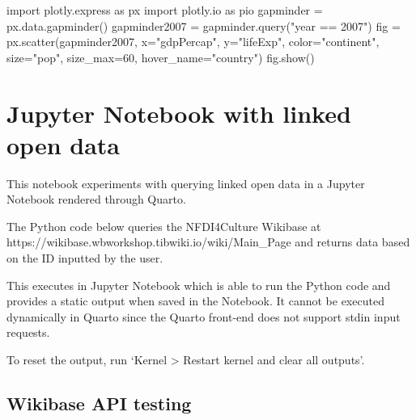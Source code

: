 \documentclass[
  letterpaper,
  DIV=11,
  numbers=noendperiod]{scrreprt}
\newenvironment{Shaded}{\begin{snugshade}}{\end{snugshade}}
\newcommand{\DecValTok}[1]{\textcolor[rgb]{0.68,0.00,0.00}{#1}}
\newcommand{\ImportTok}[1]{\textcolor[rgb]{0.00,0.46,0.62}{#1}}
\newcommand{\NormalTok}[1]{\textcolor[rgb]{0.00,0.23,0.31}{#1}}
\newcommand{\OperatorTok}[1]{\textcolor[rgb]{0.37,0.37,0.37}{#1}}
\newcommand{\StringTok}[1]{\textcolor[rgb]{0.13,0.47,0.30}{#1}}
\begin{document}
\begin{Shaded}
\begin{Highlighting}[]
\ImportTok{import}\NormalTok{ plotly.express }\ImportTok{as}\NormalTok{ px}
\ImportTok{import}\NormalTok{ plotly.io }\ImportTok{as}\NormalTok{ pio}
\NormalTok{gapminder }\OperatorTok{=}\NormalTok{ px.data.gapminder()}
\NormalTok{gapminder2007 }\OperatorTok{=}\NormalTok{ gapminder.query(}\StringTok{"year == 2007"}\NormalTok{)}
\NormalTok{fig }\OperatorTok{=}\NormalTok{ px.scatter(gapminder2007, }
\NormalTok{                 x}\OperatorTok{=}\StringTok{"gdpPercap"}\NormalTok{, y}\OperatorTok{=}\StringTok{"lifeExp"}\NormalTok{, color}\OperatorTok{=}\StringTok{"continent"}\NormalTok{, }
\NormalTok{                 size}\OperatorTok{=}\StringTok{"pop"}\NormalTok{, size\_max}\OperatorTok{=}\DecValTok{60}\NormalTok{,}
\NormalTok{                 hover\_name}\OperatorTok{=}\StringTok{"country"}\NormalTok{)}
\NormalTok{fig.show()}
\end{Highlighting}
\end{Shaded}


\hypertarget{jupyter-notebook-with-linked-open-data}{%
\chapter{Jupyter Notebook with linked open
data}\label{jupyter-notebook-with-linked-open-data}}

This notebook experiments with querying linked open data in a Jupyter
Notebook rendered through Quarto.

The Python code below queries the NFDI4Culture Wikibase at
https://wikibase.wbworkshop.tibwiki.io/wiki/Main\_Page and returns data
based on the ID inputted by the user.

This executes in Jupyter Notebook which is able to run the Python code
and provides a static output when saved in the Notebook. It cannot be
executed dynamically in Quarto since the Quarto front-end does not
support stdin input requests.

To reset the output, run `Kernel \textgreater{} Restart kernel and clear
all outputs'.

\hypertarget{wikibase-api-testing}{%
\section{Wikibase API testing}\label{wikibase-api-testing}}
\end{document}
